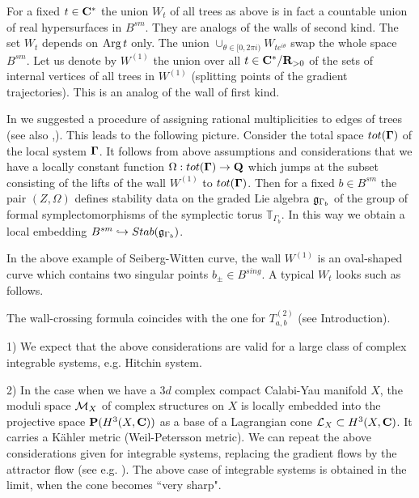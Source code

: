 \documentclass[12pt]{article}
\begin{document}
For a fixed $t\in {\bf C}^{\ast}$ the union $W_t$ of all trees as above is in fact a countable union of real hypersurfaces in $B^{sm}$. They are analogs of the walls of second kind. The set $W_t$ depends on $\operatorname{Arg}t$ only. The union
$\cup_{\theta\in [0,2\pi i)}W_{te^{i\theta}}$ swap the whole space $B^{sm}$. Let us denote by $W^{(1)}$ the union over all $t\in {\bf C}^{\ast}/{\bf R}_{>0}$ of the sets of internal vertices of all trees in $W^{(1)}$ (splitting points of the gradient trajectories). This is an analog of the wall of first kind.

In \cite{KoSo1} we suggested a procedure of assigning rational multiplicities to edges of trees (see also \cite{GS1},\cite{GS2}).
 This leads to the following picture. Consider the total space $tot({\bf \Gamma})$ of the local system ${\bf \Gamma}$. It follows from above assumptions and considerations that we have a locally constant function $\Omega:tot({\bf \Gamma})\to {\bf Q}$ which jumps at the subset consisting of the lifts of the wall $W^{(1)}$ to $tot({\bf \Gamma})$.  Then for a fixed $b\in
B^{sm}$ the pair $(Z,\Omega)$ defines stability data on the graded Lie algebra ${\mathfrak g}_{\Gamma_b}$ of the group of formal symplectomorphisms of the symplectic torus ${\mathbb T}_{\Gamma_b}$. In this way we obtain a local embedding $B^{sm}\hookrightarrow Stab({\mathfrak g}_{\Gamma_b})$.

In the above example of Seiberg-Witten curve, the wall $W^{(1)}$ is an oval-shaped curve which contains two singular points 
$b_{\pm}\in B^{sing}$. 
A typical $W_t$ looks such as follows.

\vspace{3mm}

\centerline{}

\vspace{3mm}



\vspace{3mm}



The wall-crossing formula coincides with the one for $T_{a,b}^{(2)}$ (see Introduction).

\begin{rmk} 1) We expect that the above considerations are valid for a large class of complex integrable systems, e.g. Hitchin system.

2) In the case when we have a $3d$ complex compact Calabi-Yau manifold $X$, the moduli space ${\cal M}_X$ of complex structures on $X$ is locally embedded into the projective space ${\bf P}(H^3(X,{\bf C}))$ as a base of a Lagrangian cone ${\cal L}_X\subset H^3(X,{\bf C})$. It carries a K\"ahler metric (Weil-Petersson metric). We can repeat the above considerations given for integrable systems, replacing the gradient flows by the attractor flow (see e.g. \cite{DM}). The above case of integrable systems is obtained in the limit,  when the cone becomes ``very sharp".





\end{rmk}
\end{document}
